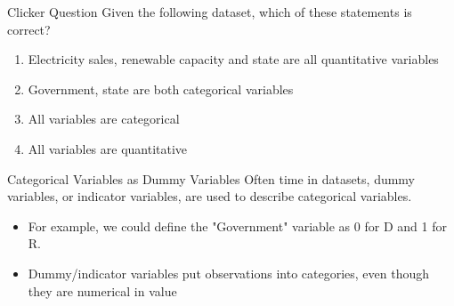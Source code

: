 \documentclass{beamer}
\begin{document}
\begin{frame}{Clicker Question}
    Given the following dataset, which of these statements is correct?
    
    \begin{center}
    \end{center}

    \begin{enumerate}[label=(\alph*)]
        \item Electricity sales, renewable capacity and state are all quantitative variables
        \item Government, state are both categorical variables
        \item All variables are categorical
        \item All variables are quantitative
    \end{enumerate}
\end{frame}

\begin{frame}{Categorical Variables as Dummy Variables}
    Often time in datasets, \alert{dummy variables}, or indicator variables, are used to describe categorical variables. 

    \begin{itemize}
        \item For example, we could define the "Government" variable as 0 for D and 1 for R. 
        \item Dummy/indicator variables put observations into categories, even though they are numerical in value
    \end{itemize}
\end{frame}
\end{document}
